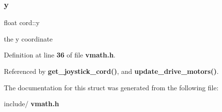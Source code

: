 \mbox{\label{structcord_a4e7d289c55cfe511532e53a81dc19215}} 
\subsubsection{y}
{\footnotesize\ttfamily float cord\+::y}

the y coordinate 

Definition at line \textbf{ 36} of file \textbf{ vmath.\+h}.



Referenced by \textbf{ get\+\_\+joystick\+\_\+cord()}, and \textbf{ update\+\_\+drive\+\_\+motors()}.



The documentation for this struct was generated from the following file\+:\begin{DoxyCompactItemize}
\item 
include/\textbf{ vmath.\+h}\end{DoxyCompactItemize}

